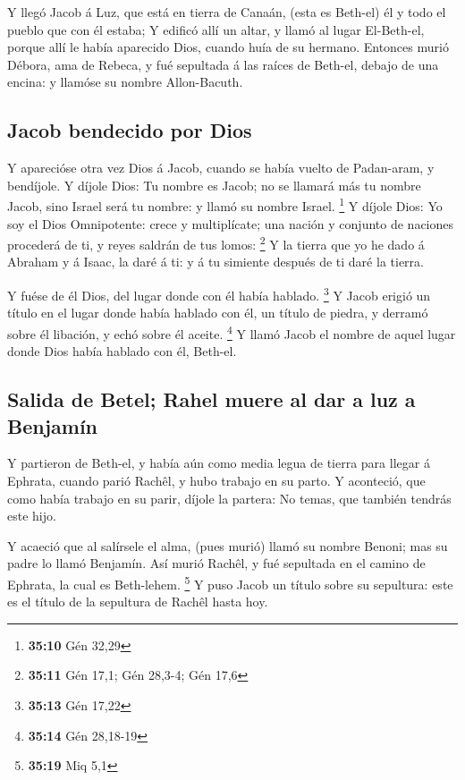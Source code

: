  Y llegó Jacob á Luz, que está en tierra de Canaán, (esta
es Beth-el) él y todo el pueblo que con él estaba;  Y
edificó allí un altar, y llamó al lugar El-Beth-el, porque allí le había
aparecido Dios, cuando huía de su hermano.  Entonces murió
Débora, ama de Rebeca, y fué sepultada á las raíces de Beth-el, debajo
de una encina: y llamóse su nombre Allon-Bacuth.

\hypertarget{jacob-bendecido-por-dios}{%
\subsection{Jacob bendecido por Dios}\label{jacob-bendecido-por-dios}}

 Y aparecióse otra vez Dios á Jacob, cuando se había
vuelto de Padan-aram, y bendíjole.  Y díjole Dios: Tu
nombre es Jacob; no se llamará más tu nombre Jacob, sino Israel será tu
nombre: y llamó su nombre Israel. \footnote{\textbf{35:10} Gén 32,29}
 Y díjole Dios: Yo soy el Dios Omnipotente: crece y
multiplícate; una nación y conjunto de naciones procederá de ti, y reyes
saldrán de tus lomos: \footnote{\textbf{35:11} Gén 17,1; Gén 28,3-4; Gén
  17,6}  Y la tierra que yo he dado á Abraham y á Isaac,
la daré á ti: y á tu simiente después de ti daré la tierra.

 Y fuése de él Dios, del lugar donde con él había
hablado. \footnote{\textbf{35:13} Gén 17,22}  Y Jacob
erigió un título en el lugar donde había hablado con él, un título de
piedra, y derramó sobre él libación, y echó sobre él aceite. \footnote{\textbf{35:14}
  Gén 28,18-19}  Y llamó Jacob el nombre de aquel lugar
donde Dios había hablado con él, Beth-el.

\hypertarget{salida-de-betel-rahel-muere-al-dar-a-luz-a-benjamuxedn}{%
\subsection{Salida de Betel; Rahel muere al dar a luz a
Benjamín}\label{salida-de-betel-rahel-muere-al-dar-a-luz-a-benjamuxedn}}

 Y partieron de Beth-el, y había aún como media legua de
tierra para llegar á Ephrata, cuando parió Rachêl, y hubo trabajo en su
parto.  Y aconteció, que como había trabajo en su parir,
díjole la partera: No temas, que también tendrás este hijo.

 Y acaeció que al salírsele el alma, (pues murió) llamó
su nombre Benoni; mas su padre lo llamó Benjamín.  Así
murió Rachêl, y fué sepultada en el camino de Ephrata, la cual es
Beth-lehem. \footnote{\textbf{35:19} Miq 5,1}  Y puso
Jacob un título sobre su sepultura: este es el título de la sepultura de
Rachêl hasta hoy.

